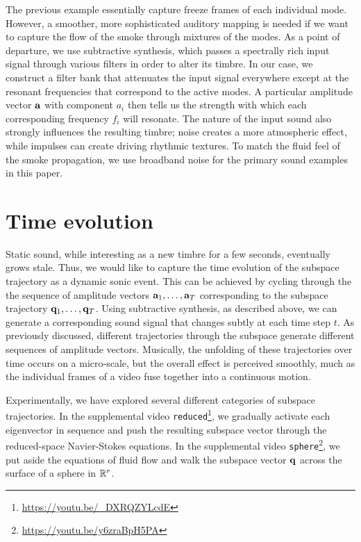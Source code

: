 \documentclass[11pt]{article}
\begin{document}
The previous example essentially capture freeze frames of each individual mode. However, a smoother, more sophisticated auditory mapping is needed if we want to capture the flow of the smoke through mixtures of the modes. As a point of departure, we use subtractive synthesis, which passes a spectrally rich input signal through various filters in order to alter its timbre. In our case, we construct a filter bank that attenuates the input signal everywhere except at the resonant frequencies that correspond to the active modes. A particular amplitude vector $\mathbf{a}$ with component $a_i$ then tells us the strength with which each corresponding frequency $f_i$ will resonate. The nature of the input sound also strongly influences the resulting timbre; noise creates a more atmospheric effect, while impulses can create driving rhythmic textures. To match the fluid feel of the smoke propagation, we use broadband noise for the primary sound examples in this paper.

\section*{Time evolution}
Static sound, while interesting as a new timbre for a few seconds, eventually grows stale. Thus, we would like to capture the time evolution of the subspace trajectory as a dynamic sonic event. This can be achieved by cycling through the the sequence of amplitude vectors $\mathbf{a}_1, \ldots, \mathbf{a}_T$ corresponding to the subspace trajectory $\mathbf{q}_1, \ldots, \mathbf{q}_T$. Using subtractive synthesis, as described above, we can generate a corresponding sound signal that changes subtly at each time step $t$. As previously discussed, different trajectories through the subspace generate different sequences of amplitude vectors. Musically, the unfolding of these trajectories over time occurs on a micro-scale, but the overall effect is perceived smoothly, much as the individual frames of a video fuse together into a continuous motion.

Experimentally, we have explored several different categories of subspace trajectories. In the supplemental video {\tt reduced}\footnote{\url{https://youtu.be/_DXRQZYLcdE}}, we gradually activate each eigenvector in sequence and push the resulting subspace vector through the reduced-space Navier-Stokes equations. In the supplemental video {\tt sphere}\footnote{\url{https://youtu.be/y6zraBpH5PA}}, we put aside the equations of fluid flow and walk the subspace vector $\mathbf{q}$ across the surface of a sphere in $\mathbb{R}^r$. 
\end{document}
